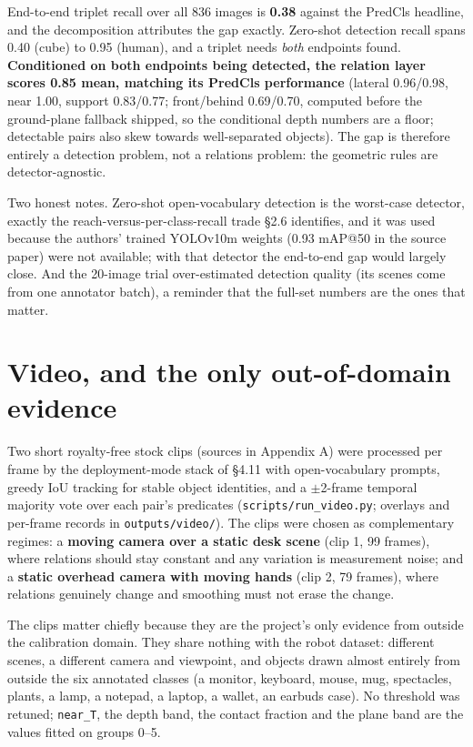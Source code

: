 End-to-end triplet recall over all 836 images is \textbf{0.38} against the PredCls headline, and the decomposition attributes the gap exactly. Zero-shot detection recall spans 0.40 (cube) to 0.95 (human), and a triplet needs \textit{both} endpoints found. \textbf{Conditioned on both endpoints being detected, the relation layer scores 0.85 mean, matching its PredCls performance} (lateral 0.96/0.98, near 1.00, support 0.83/0.77; front/behind 0.69/0.70, computed before the ground-plane fallback shipped, so the conditional depth numbers are a floor; detectable pairs also skew towards well-separated objects). The gap is therefore entirely a detection problem, not a relations problem: the geometric rules are detector-agnostic.

Two honest notes. Zero-shot open-vocabulary detection is the worst-case detector, exactly the reach-versus-per-class-recall trade \S2.6 identifies, and it was used because the authors' trained YOLOv10m weights (0.93 mAP@50 in the source paper) were not available; with that detector the end-to-end gap would largely close. And the 20-image trial over-estimated detection quality (its scenes come from one annotator batch), a reminder that the full-set numbers are the ones that matter.

\section{Video, and the only out-of-domain evidence}

Two short royalty-free stock clips (sources in Appendix A) were processed per frame by the deployment-mode stack of \S4.11 with open-vocabulary prompts, greedy IoU tracking for stable object identities, and a $\pm$2-frame temporal majority vote over each pair's predicates (\texttt{scripts/run\_video.py}; overlays and per-frame records in \texttt{outputs/video/}). The clips were chosen as complementary regimes: a \textbf{moving camera over a static desk scene} (clip 1, 99 frames), where relations should stay constant and any variation is measurement noise; and a \textbf{static overhead camera with moving hands} (clip 2, 79 frames), where relations genuinely change and smoothing must not erase the change.

The clips matter chiefly because they are the project's only evidence from outside the calibration domain. They share nothing with the robot dataset: different scenes, a different camera and viewpoint, and objects drawn almost entirely from outside the six annotated classes (a monitor, keyboard, mouse, mug, spectacles, plants, a lamp, a notepad, a laptop, a wallet, an earbuds case). No threshold was retuned; \texttt{near\_T}, the depth band, the contact fraction and the plane band are the values fitted on groups 0--5.


